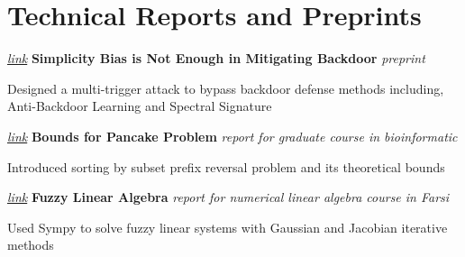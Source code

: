 \section{Technical Reports and Preprints}

\begin{twocolentry}{
		\textit{\href{https://mehrdad3301.github.io/files/simplicity_bias.pdf}{link}}}
	\textbf{Simplicity Bias is Not Enough in Mitigating Backdoor} \textit{preprint}
\end{twocolentry}

\begin{onecolentry}
 Designed a multi-trigger attack to bypass backdoor defense methods including, Anti-Backdoor Learning and Spectral Signature 
\end{onecolentry}

\vspace{0.2 cm}

\begin{twocolentry}{
		\textit{\href{https://mehrdad3301.github.io/files/pancakes.pdf}{link}}}
	\textbf{Bounds for Pancake Problem} \textit{report for graduate course in bioinformatic}
\end{twocolentry}

\begin{onecolentry}
	Introduced sorting by subset prefix reversal problem and its theoretical bounds
\end{onecolentry}

\vspace{0.2 cm}

\begin{twocolentry}{
		\textit{\textit{\href{https://mehrdad3301.github.io/files/fuzzy.pdf}{link}}}}
	\textbf{Fuzzy Linear Algebra}
	\textit{report for numerical linear algebra course in Farsi}
\end{twocolentry}

\begin{onecolentry}
	Used Sympy to solve fuzzy linear systems with Gaussian and Jacobian iterative methods 
\end{onecolentry}
